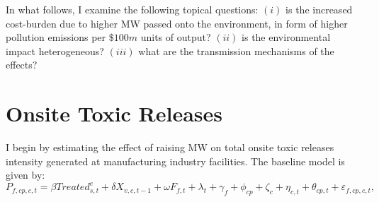 \documentclass[12pt, english]{article}
\begin{document}
    In what follows, I examine the following topical questions: $(i)$ is the increased cost-burden due to higher MW passed onto the environment, in form of higher pollution emissions per $\$100m$ units of output? $(ii)$ is the environmental impact heterogeneous? $(iii)$ what are the transmission mechanisms of the effects?


    \section{Onsite Toxic Releases}\label{sec:onsite-toxic-releases}
    I begin by estimating the effect of raising MW on total onsite toxic releases intensity generated at manufacturing industry facilities. The baseline model is given by:
    \begin{equation}
        P_{f,cp,c,t} = \beta Treated_{s,t}^e + \delta X_{v,c,t-1} + \omega F_{f,t} + \lambda_{t} + \gamma_{f} + \phi_{cp} + \zeta_{c} + \eta_{c,t} + \theta_{cp,t} + \varepsilon_{f,cp,c,t},\label{eq:baseline-total-onsite-releases-intensity}
    \end{equation}
\end{document}
